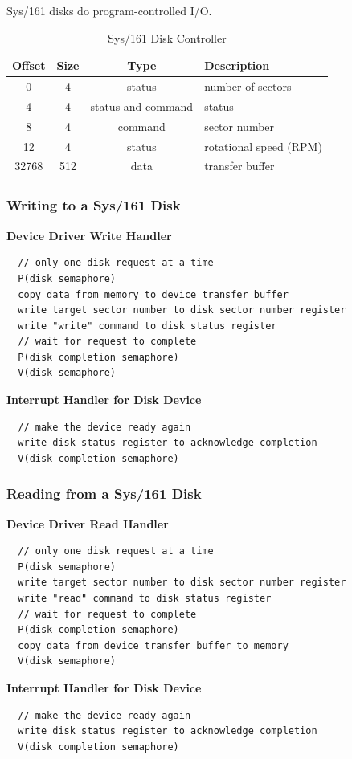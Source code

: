 \documentclass[12pt]{article}
\theoremstyle{plain}
\theoremstyle{definition}
\begin{document}
Sys/161 disks do program-controlled I/O.
\begin{table}[H]
  \vspace{-20pt}
  \caption{Sys/161 Disk Controller}
  \label{tab:sys1161_disk_control}
  \centering

  \begin{tabular}{|c|c|c|l|}
  \hline
  Offset & Size & Type & Description \\ \hline \hline
  0 & 4 & status & number of sectors \\ \hline
  4 & 4 & status and command & status \\ \hline
  8 & 4 & command & sector number \\ \hline
  12 & 4 & status & rotational speed (RPM) \\ \hline
  32768 & 512 & data & transfer buffer \\ \hline
  \end{tabular}
\end{table}

\subsubsection{Writing to a Sys/161 Disk}
\textbf{Device Driver Write Handler}
\begin{verbatim}
  // only one disk request at a time
  P(disk semaphore)
  copy data from memory to device transfer buffer
  write target sector number to disk sector number register
  write "write" command to disk status register
  // wait for request to complete
  P(disk completion semaphore)
  V(disk semaphore)
\end{verbatim}
\medskip
\textbf{Interrupt Handler for Disk Device}
\begin{verbatim}
  // make the device ready again
  write disk status register to acknowledge completion
  V(disk completion semaphore)
\end{verbatim}

\subsubsection{Reading from a Sys/161 Disk}
\textbf{Device Driver Read Handler}
\begin{verbatim}
  // only one disk request at a time
  P(disk semaphore)
  write target sector number to disk sector number register
  write "read" command to disk status register
  // wait for request to complete
  P(disk completion semaphore)
  copy data from device transfer buffer to memory
  V(disk semaphore)
\end{verbatim}
\medskip
\textbf{Interrupt Handler for Disk Device}
\begin{verbatim}
  // make the device ready again
  write disk status register to acknowledge completion
  V(disk completion semaphore)
\end{verbatim}
\end{document}
